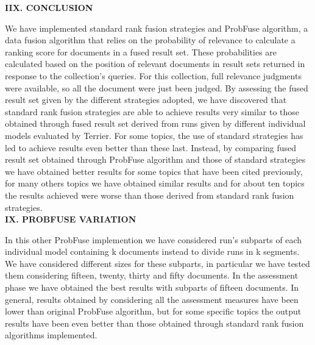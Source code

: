 \documentclass[12pt,journal]{IEEEtran}
\begin{document}
\textbf{IIX. CONCLUSION}

We have implemented standard rank fusion strategies and ProbFuse algorithm, a data fusion algorithm that relies on the probability of relevance to calculate a ranking score for documents in a fused result set.
These probabilities are calculated based on the position of relevant documents in result sets returned in response to the collection’s queries. For this collection, full relevance judgments were available, so all the document were just been judged. 
By assessing the fused result set given by the different strategies adopted, we have discovered that standard rank fusion strategies are able to achieve results very similar to those obtained through fused result set derived from runs given by different individual models evaluated by Terrier. For some topics, the use of standard strategies has led to achieve results even better than these last. Instead, by comparing fused result set obtained through ProbFuse algorithm and those of standard strategies we have obtained better results for some topics that have been cited previously, for many others topics we have obtained similar results and for about ten topics the results achieved were worse than those derived from standard rank fusion strategies. \\

\textbf{IX.	PROBFUSE VARIATION}

In this other ProbFuse implemention we have considered run's subparts of each individual model containing k documents instead to divide runs in k segments. We have considered different sizes for these subparts, in particular we have tested them considering fifteen, twenty, thirty and fifty documents. In the assessment phase we have obtained the best results with subparts of fifteen documents. In general, results obtained by considering all the assessment measures have been lower than original ProbFuse algorithm, but for some specific topics the output results have been even better than those obtained through standard rank fusion algorithms implemented.  \\
\end{document}
